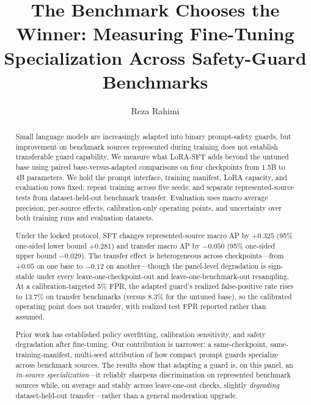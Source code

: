 \documentclass[sigconf,nonacm]{acmart}
\begin{document}
\title{The Benchmark Chooses the Winner: Measuring Fine-Tuning Specialization Across Safety-Guard Benchmarks}

\author{Reza Rahimi}

\begin{abstract}
Small language models are increasingly adapted into binary prompt-safety guards, but improvement on benchmark sources represented during training does not establish transferable guard capability. We measure what LoRA-SFT adds beyond the untuned base using paired base-versus-adapted comparisons on four checkpoints from 1.5B to 4B parameters. We hold the prompt interface, training manifest, LoRA capacity, and evaluation rows fixed; repeat training across five seeds; and separate represented-source tests from dataset-held-out benchmark transfer. Evaluation uses macro average precision, per-source effects, calibration-only operating points, and uncertainty over both training runs and evaluation datasets.

Under the locked protocol, SFT changes represented-source macro AP by $+0.325$ (95\% one-sided lower bound $+0.281$) and transfer macro AP by $-0.050$ (95\% one-sided upper bound $-0.029$). The transfer effect is heterogeneous across checkpoints---from $+0.05$ on one base to $-0.12$ on another---though the panel-level degradation is sign-stable under every leave-one-checkpoint-out and leave-one-benchmark-out resampling. At a calibration-targeted 5\% FPR, the adapted guard's realized false-positive rate rises to 13.7\% on transfer benchmarks (versus 8.3\% for the untuned base), so the calibrated operating point does not transfer, with realized test FPR reported rather than assumed.

Prior work has established policy overfitting, calibration sensitivity, and safety degradation after fine-tuning. Our contribution is narrower: a same-checkpoint, same-training-manifest, multi-seed attribution of how compact prompt guards specialize across benchmark sources. The results show that adapting a guard is, on this panel, an \emph{in-source specialization}---it reliably sharpens discrimination on represented benchmark sources while, on average and stably across leave-one-out checks, slightly \emph{degrading} dataset-held-out transfer---rather than a general moderation upgrade.
\end{abstract}

\maketitle
\end{document}
